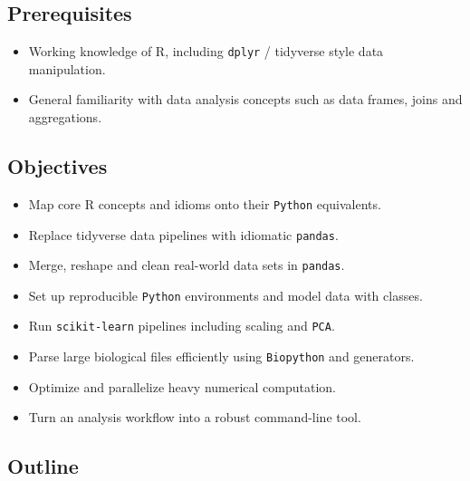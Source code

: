 \documentclass[
]{article}
\providecommand{\tightlist}{%
  \setlength{\itemsep}{0pt}\setlength{\parskip}{0pt}}
\begin{document}
\subsection{Prerequisites}\label{prerequisites}

\begin{itemize}
\tightlist
\item
  Working knowledge of R, including \texttt{dplyr} / tidyverse style
  data manipulation.
\item
  General familiarity with data analysis concepts such as data frames,
  joins and aggregations.
\end{itemize}

\subsection{Objectives}\label{objectives}

\begin{itemize}
\tightlist
\item
  Map core R concepts and idioms onto their \texttt{Python} equivalents.
\item
  Replace tidyverse data pipelines with idiomatic \texttt{pandas}.
\item
  Merge, reshape and clean real-world data sets in \texttt{pandas}.
\item
  Set up reproducible \texttt{Python} environments and model data with
  classes.
\item
  Run \texttt{scikit-learn} pipelines including scaling and
  \texttt{PCA}.
\item
  Parse large biological files efficiently using \texttt{Biopython} and
  generators.
\item
  Optimize and parallelize heavy numerical computation.
\item
  Turn an analysis workflow into a robust command-line tool.
\end{itemize}

\subsection{Outline}\label{outline}
\end{document}
